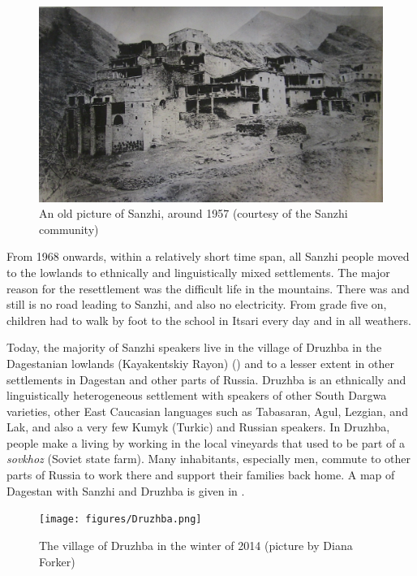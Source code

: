 \begin{figure}
	\caption{An old picture of Sanzhi, around 1957 (courtesy of the Sanzhi community)}
	\label{fig:Sanzhi 3}
	\includegraphics[scale=0.3]{figures/Sanzhi_3.png}
\end{figure}




From 1968 onwards, within a relatively short time span, all Sanzhi people moved to the lowlands to ethnically and linguistically mixed settlements. The major reason for the resettlement was the difficult life in the mountains. There was and still is no road leading to Sanzhi, and also no electricity. From grade five on, children had to walk by foot to the school in Itsari every day and in all weathers.

Today, the majority of Sanzhi speakers live in the village of Druzhba in the Dagestanian lowlands (Kayakentskiy Rayon) () and to a lesser extent in other settlements in Dagestan and other parts of Russia. Druzhba is an ethnically and linguistically heterogeneous settlement with speakers of other South Dargwa varieties, other East Caucasian languages such as Tabasaran, Agul, Lezgian, and Lak, and also a very few Kumyk (Turkic) and Russian speakers. In Druzhba, people make a living by working in the local vineyards that used to be part of a \textit{sovkhoz} (Soviet state farm). Many inhabitants, especially men, commute to other parts of Russia to work there and support their families back home. A map of Dagestan with Sanzhi and Druzhba is given in .

\begin{figure}
	\caption{The village of Druzhba in the winter of 2014 (picture by Diana Forker)}
	\label{fig:Druzhba}
	\texttt{[image: figures/Druzhba.png]}
\end{figure}


